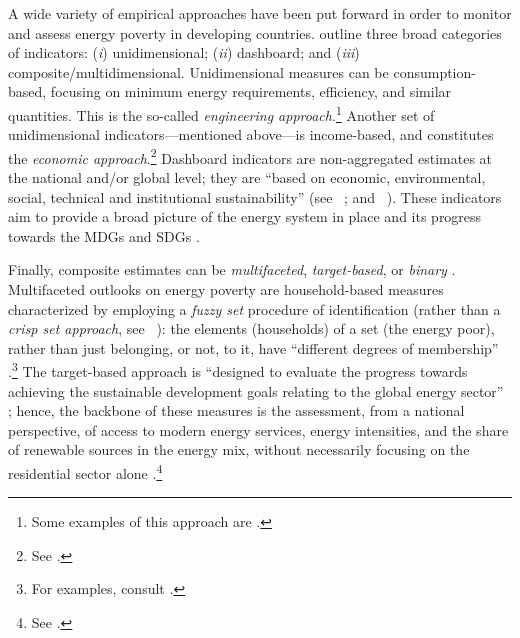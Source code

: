 \documentclass[11pt, a4paper]{article}
\newcommand{\citealp}[1]{\citeauthor{#1}~\citeyear{#1}}
\begin{document}
A wide variety of empirical approaches have been put forward in order to monitor and assess energy poverty in developing countries. \textcite[p. 6]{sy2022a} outline three broad categories of indicators: (\textit{i}) unidimensional; (\textit{ii}) dashboard; and (\textit{iii}) composite/multidimensional. Unidimensional measures can be consumption-based, focusing on minimum energy requirements, efficiency, and similar quantities. This is the so-called \textit{engineering approach}.\footnote{Some examples of this approach are \textcite{goldemberg1990, johansson2000, krugmann1983, reddy1999, parikh1978, pachauri2004, swan2009, ye2021}.} Another set of unidimensional indicators---mentioned above---is income-based, and constitutes the \textit{economic approach}.\footnote{See \textcite{leach1987, barnes2010, barnes2011, phoumin2019, khundi-mkomba2021, hills2011, hills2012, boardman1991, bradshaw1983}.} Dashboard indicators are non-aggregated estimates at the national and/or global level; they are ``based on economic, environmental, social, technical and institutional sustainability'' \parencite[p. 8]{sy2022a} (see \citealp{manning2009}; and \citealp{vera2007}). These indicators aim to provide a broad picture of the energy system in place and its progress towards the MDGs and SDGs \parencite{zotero-item-1064, zotero-item-1065}.

Finally, composite estimates can be \textit{multifaceted}, \textit{target-based}, or \textit{binary} \parencite{sy2022a}. Multifaceted outlooks on energy poverty are household-based measures characterized by employing a \textit{fuzzy set} procedure of identification (rather than a \textit{crisp set approach}, see \citealp{olsen2009}): the elements (households) of a set (the energy poor), rather than just belonging, or not, to it, have ``different degrees of membership'' \parencite[p. 102]{alkire2015}.\footnote{For examples, consult \textcite{nathan2020, olang2018, bhatia2015, gupta2020, seuret-jimenez2020}.} The target-based approach is ``designed to evaluate the progress towards achieving the sustainable
development goals relating to the global energy sector'' \parencite[p. 11]{sy2022a}; hence, the backbone of these measures is the assessment, from a national perspective, of access to modern energy services, energy intensities, and the share of renewable sources in the energy mix, without necessarily focusing on the residential sector alone \parencite{primc2019}.\footnote{See \textcite{wang2017, banerjee2021, khanna2019, bonatz2019, che2021, li2021}.} 
\end{document}
